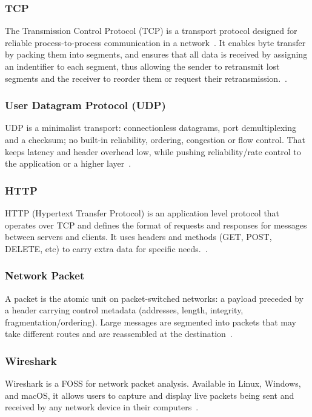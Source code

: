 \subsubsection{TCP}
The Transmission Control Protocol (TCP) is a transport protocol designed for
reliable process-to-process communication in a
network~\cite{tanenbaum:networks}. It enables byte transfer by packing them
into segments, and ensures that all data is received by assigning an
indentifier to each segment, thus allowing the sender to retransmit lost
segments and the receiver to reorder them or request their
retransmission.~\cite{rfc793}.

\subsubsection{User Datagram Protocol (UDP)}
UDP is a minimalist transport: connectionless datagrams, port demultiplexing
and a checksum; no built-in reliability, ordering, congestion or flow control.
That keeps latency and header overhead low, while pushing reliability/rate
control to the application or a higher layer~\cite{rfc768,rfc8085,kurose:2021}.

\subsubsection{HTTP}
HTTP (Hypertext Transfer Protocol) is an application level protocol that
operates over TCP and defines the format of requests and responses for messages
between servers and clients. It uses headers and methods (GET, POST, DELETE,
etc) to carry extra data for specific needs.~\cite{rfc9110}.

\subsubsection{Network Packet}
A packet is the atomic unit on packet-switched networks: a payload preceded by
a header carrying control metadata (addresses, length, integrity,
fragmentation/ordering). Large messages are segmented into packets that may
take different routes and are reassembled at the
destination~\cite{tanenbaum:networks,rfc791,kurose:2021}.

\subsubsection{Wireshark}
Wireshark is a FOSS for network packet analysis. Available in Linux, Windows,
and macOS, it allows users to capture and display live packets being sent and
received by any network device in their computers~\cite{wireshark:guide}.

